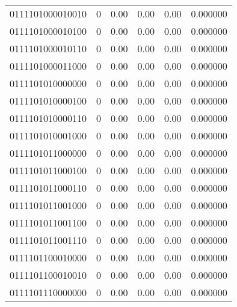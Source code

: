 \begin{tabular}{lrrrrr}
0111101000010010 &         0 &      0.00 &     0.00 &     0.00 &  0.000000 \\
0111101000010100 &         0 &      0.00 &     0.00 &     0.00 &  0.000000 \\
0111101000010110 &         0 &      0.00 &     0.00 &     0.00 &  0.000000 \\
0111101000011000 &         0 &      0.00 &     0.00 &     0.00 &  0.000000 \\
0111101010000000 &         0 &      0.00 &     0.00 &     0.00 &  0.000000 \\
0111101010000100 &         0 &      0.00 &     0.00 &     0.00 &  0.000000 \\
0111101010000110 &         0 &      0.00 &     0.00 &     0.00 &  0.000000 \\
0111101010001000 &         0 &      0.00 &     0.00 &     0.00 &  0.000000 \\
0111101011000000 &         0 &      0.00 &     0.00 &     0.00 &  0.000000 \\
0111101011000100 &         0 &      0.00 &     0.00 &     0.00 &  0.000000 \\
0111101011000110 &         0 &      0.00 &     0.00 &     0.00 &  0.000000 \\
0111101011001000 &         0 &      0.00 &     0.00 &     0.00 &  0.000000 \\
0111101011001100 &         0 &      0.00 &     0.00 &     0.00 &  0.000000 \\
0111101011001110 &         0 &      0.00 &     0.00 &     0.00 &  0.000000 \\
0111101100010000 &         0 &      0.00 &     0.00 &     0.00 &  0.000000 \\
0111101100010010 &         0 &      0.00 &     0.00 &     0.00 &  0.000000 \\
0111101110000000 &         0 &      0.00 &     0.00 &     0.00 &  0.000000 \\
\bottomrule
\end{tabular}
